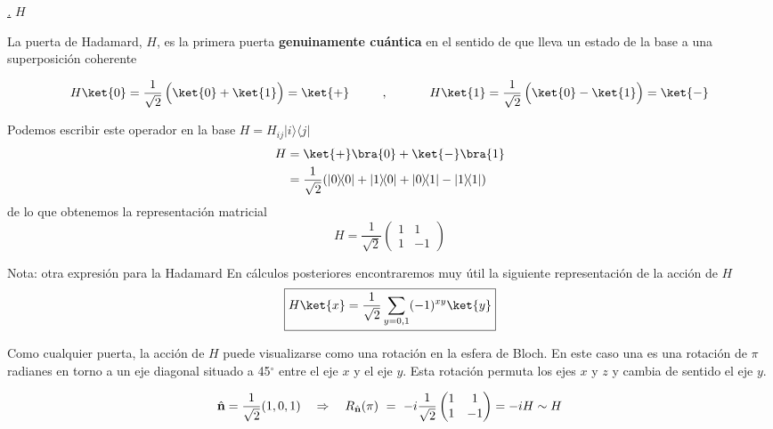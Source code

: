 \documentclass[a4paper,11pt]{book} %
\numberwithin{equation}{chapter}
\def\lp{\left(}
\def\rp{\right)}
\newcommand{\ketbra}[2]{| #1\rangle \! \langle #2|}
\def\rqa{\quad \Rightarrow \quad}
\def\subsubiContadorIt{\par\addtocounter{subsubsection}{1}\underline{\it\thesubsubsection.}\hskip0.5cm \setcounter{subsubsubsectionIt}{0}}
\newcommand{\SubsubiIt}[1]{
		\subsubiContadorIt \textit{#1}
	}
\newcounter{subsubsubsectionIt}[subsubsection]
\begin{document}
            \SubsubiIt{$H$}
       
La puerta de Hadamard, $H$, es la primera puerta \textbf{genuinamente cuántica} en el sentido de que lleva un estado de la base a una superposición coherente

	\begin{equation}
	H \ket{0} = \frac{1}{\sqrt{2}}\left(\rule{0mm}{4mm}\ket{0} + \ket{1}\right) =\ket{+} 
	 ~~~~~~~~,~~~~~~~~~~
	H \ket{1} = \frac{1}{\sqrt{2}}\left(\rule{0mm}{4mm}\ket{0} - \ket{1}\right) =\ket{-} 
	\end{equation}

Podemos escribir este operador en la base $H = H_{ij}\ketbra{i}{j}$
	\begin{align*}
	H &=  \ket{+}\bra{0} +  \ket{-}\bra{1} \\
	  &= \frac{1}{\sqrt{2}}(\ketbra{0}{0} + \ketbra{1}{0} + \ketbra{0}{1} - \ketbra{1}{1})
	\end{align*}
de  lo que obtenemos la representación matricial
	\begin{equation} \label{ec_puertas_simples_H}
	\boxed{H   =  \frac{1}{\sqrt{2}} \lp \begin{matrix} 1 & 1 \\ 1 & -1 \end{matrix} \rp}
	\end{equation}

	\begin{mybox_blue}{Nota: otra expresión para la Hadamard}
	En cálculos posteriores encontraremos muy útil la siguiente representación de la acción de $H$
	\begin{equation} \label{ec_puertas_simples_H_sobre_1_qubit}
	\boxed{H \ket{x} =\frac{1}{\sqrt{2}} \sum_{y=0,1} (-1)^{ x  y} \ket{y}}
	\end{equation}
	\end{mybox_blue}

Como cualquier puerta, la acción de $H$ puede visualizarse como una rotación en la esfera de Bloch. En este caso una es una rotación de $\pi$ radianes en torno a un eje diagonal situado a 45$^\circ$ entre el eje $x$ y el eje $y$. Esta rotación permuta los ejes $x$ y $z$ y cambia de sentido el eje $y$.

\begin{equation}
\hat{\bf n} = \frac{1}{\sqrt{2}}(1,0,1) \rqa 
R_{\hat{\bf n}}(\pi) ~ = ~ -i\frac{1}{\sqrt{2}} \lp \begin{matrix} 1  & 1 \\ 1 & -1  \end{matrix} \rp =-i H \sim H 
\end{equation}
\end{document}

